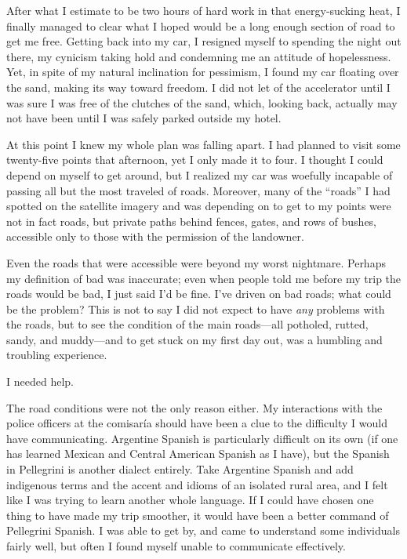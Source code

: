 {After what I estimate to be two hours of hard work in that energy-sucking heat, I finally managed to clear what I hoped would be a long enough section of road to get me free. Getting back into my car, I resigned myself to spending the night out there, my cynicism taking hold and condemning me an attitude of hopelessness. Yet, in spite of my natural inclination for pessimism, I found my car floating over the sand, making its way toward freedom. I did not let of the accelerator until I was sure I was free of the clutches of the sand, which, looking back, actually may not have been until I was safely parked outside my hotel.

At this point I knew my whole plan was falling apart. I had planned to visit some twenty-five points that afternoon, yet I only made it to four. I thought I could depend on myself to get around, but I realized my car was woefully incapable of passing all but the most traveled of roads. Moreover, many of the “roads” I had spotted on the satellite imagery and was depending on to get to my points were not in fact roads, but private paths behind fences, gates, and rows of bushes, accessible only to those with the permission of the landowner.

Even the roads that were accessible were beyond my worst nightmare. Perhaps my definition of bad was inaccurate; even when people told me before my trip the roads would be bad, I just said I’d be fine. I’ve driven on bad roads; what could be the problem? This is not to say I did not expect to have \textit{any} problems with the roads, but to see the condition of the main roads—all potholed, rutted, sandy, and muddy—and to get stuck on my first day out, was a humbling and troubling experience.

I needed help.

The road conditions were not the only reason either. My interactions with the police officers at the comisaría should have been a clue to the difficulty I would have communicating. Argentine Spanish is particularly difficult on its own (if one has learned Mexican and Central American Spanish as I have), but the Spanish in Pellegrini is another dialect entirely. Take Argentine Spanish and add indigenous terms and the accent and idioms of an isolated rural area, and I felt like I was trying to learn another whole language. If I could have chosen one thing to have made my trip smoother, it would have been a better command of Pellegrini Spanish. I was able to get by, and came to understand some individuals fairly well, but often I found myself unable to communicate effectively.

}
